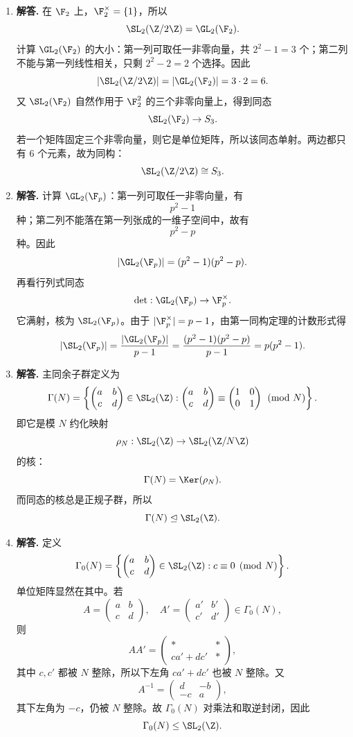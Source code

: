 \begin{enumerate}[label=\textbf{\arabic*.}, leftmargin=*, itemsep=1em]
\item \textbf{解答.} 在 $\F_2$ 上，$\F_2^\times=\{1\}$，所以
\[
\SL_2(\Z/2\Z)=\GL_2(\F_2).
\]
计算 $\GL_2(\F_2)$ 的大小：第一列可取任一非零向量，共 $2^2-1=3$ 个；第二列不能与第一列线性相关，只剩 $2^2-2=2$ 个选择。因此
\[
|\SL_2(\Z/2\Z)|=|\GL_2(\F_2)|=3\cdot2=6.
\]
又 $\SL_2(\F_2)$ 自然作用于 $\F_2^2$ 的三个非零向量上，得到同态
\[
\SL_2(\F_2)\to S_3.
\]
若一个矩阵固定三个非零向量，则它是单位矩阵，所以该同态单射。两边都只有 $6$ 个元素，故为同构：
\[
\SL_2(\Z/2\Z)\cong S_3.
\]

\item \textbf{解答.} 计算 $\GL_2(\F_p)$：第一列可取任一非零向量，有
\[
p^2-1
\]
种；第二列不能落在第一列张成的一维子空间中，故有
\[
p^2-p
\]
种。因此
\[
|\GL_2(\F_p)|=(p^2-1)(p^2-p).
\]
再看行列式同态
\[
\det:\GL_2(\F_p)\to \F_p^\times.
\]
它满射，核为 $\SL_2(\F_p)$。由于 $|\F_p^\times|=p-1$，由第一同构定理的计数形式得
\[
|\SL_2(\F_p)|=\frac{|\GL_2(\F_p)|}{p-1}
=\frac{(p^2-1)(p^2-p)}{p-1}
=p(p^2-1).
\]

\item \textbf{解答.} 主同余子群定义为
\[
\Gamma(N)=\left\{
\begin{pmatrix}a&b\\ c&d\end{pmatrix}\in \SL_2(\Z):
\begin{pmatrix}a&b\\ c&d\end{pmatrix}\equiv
\begin{pmatrix}1&0\\0&1\end{pmatrix}\pmod N
\right\}.
\]
即它是模 $N$ 约化映射
\[
\rho_N:\SL_2(\Z)\to \SL_2(\Z/N\Z)
\]
的核：
\[
\Gamma(N)=\Ker(\rho_N).
\]
而同态的核总是正规子群，所以
\[
\Gamma(N)\trianglelefteq \SL_2(\Z).
\]

\item \textbf{解答.} 定义
\[
\Gamma_0(N)=\left\{
\begin{pmatrix}a&b\\ c&d\end{pmatrix}\in \SL_2(\Z): c\equiv0\pmod N
\right\}.
\]
单位矩阵显然在其中。若
\[
A=\begin{pmatrix}a&b\\ c&d\end{pmatrix},\quad
A'=\begin{pmatrix}a'&b'\\ c'&d'\end{pmatrix}\in \Gamma_0(N),
\]
则
\[
AA'=\begin{pmatrix}
*&*\\
ca'+dc'&*
\end{pmatrix},
\]
其中 $c,c'$ 都被 $N$ 整除，所以下左角 $ca'+dc'$ 也被 $N$ 整除。又
\[
A^{-1}=\begin{pmatrix}d&-b\\ -c&a\end{pmatrix},
\]
其下左角为 $-c$，仍被 $N$ 整除。故 $\Gamma_0(N)$ 对乘法和取逆封闭，因此
\[
\Gamma_0(N)\le \SL_2(\Z).
\]


\end{enumerate}
